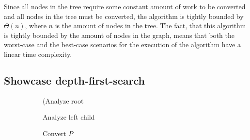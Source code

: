 Since all nodes in the tree require some constant amount of work to be converted and all nodes in the tree must be converted, the algorithm is tightly bounded by $\Theta{(n)}$, where $n$ is the amount of nodes in the tree. The fact, that this algorithm is tightly bounded by the amount of nodes in the graph, means that both the worst-case and the best-case scenarios for the execution of the algorithm have a linear time complexity.
\subsection{Showcase depth-first-search}
\begin{figure}[H]
    \centering
    \begin{subfigure}[b]{0.3\textwidth}
        \caption{(Analyze root}
    \end{subfigure}
    \begin{subfigure}[b]{0.3\textwidth}
        \caption{Analyze left child}
    \end{subfigure}
    \begin{subfigure}[b]{0.3\textwidth}
        \caption{Convert $P$}
    \end{subfigure}
    \begin{subfigure}[b]{0.3\textwidth}
\end{subfigure}
\end{figure}
